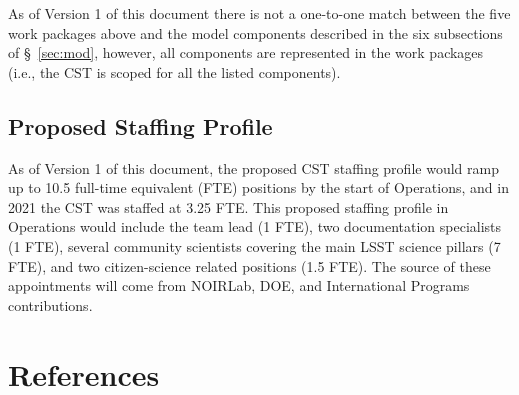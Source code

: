 \documentclass[DM,authoryear,toc]{lsstdoc}
\begin{document}
As of Version 1 of this document there is not a one-to-one match between the five work packages above and the model components described in the six subsections of \S~\ref{sec:mod}, however, all components are represented in the work packages (i.e., the CST is scoped for all the listed components).


\subsection{Proposed Staffing Profile}\label{ssec:comp_staff}

As of Version 1 of this document, the proposed CST staffing profile would ramp up to 10.5 full-time equivalent (FTE) positions by the start of Operations, and in 2021 the CST was staffed at 3.25 FTE. 
This proposed staffing profile in Operations would include the team lead (1 FTE), two documentation specialists (1 FTE), several community scientists covering the main LSST science pillars (7 FTE), and two citizen-science related positions (1.5 FTE). 
The source of these appointments will come from NOIRLab, DOE, and International Programs contributions.

\appendix
\section{References} \label{sec:bib}
\renewcommand{\refname}{} %


%
\end{document}
